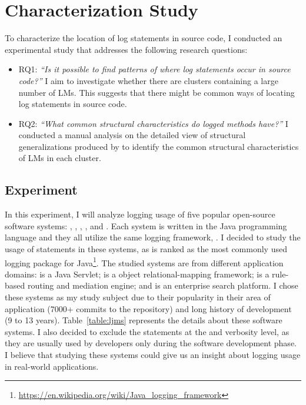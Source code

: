 \chapter{Characterization Study}\label{discover}\label{eval}

To characterize the location of log statements in source code, I conducted an experimental study that addresses the following research questions: 

\begin{itemize} [leftmargin=.5in]
\item \textsc{RQ1: }\emph{``Is it possible to find patterns of where log statements occur in source code?''} I aim to investigate whether there are clusters containing a large number of LMs. This suggests that there might be common ways of locating log statements in source code.

\item \textsc{RQ2: }\emph{``What common structural characteristics do logged methods have?''} I conducted a manual analysis on the detailed view of structural generalizations produced by  to identify the common structural characteristics of LMs in each cluster.
\end{itemize}


\section{Experiment}  \label{setup-characterization}
In this experiment, I will analyze logging usage of five popular open-source software systems: , , , , and . Each system is written in the Java programming language and they all utilize the same logging framework, . I decided to study the usage of  statements in these systems, as  is ranked as the most commonly used logging package for Java\footnote{\url{https://en.wikipedia.org/wiki/Java_logging_framework}}. The studied systems are from different application domains:  is a Java Servlet;  is a object relational-mapping framework;  is a rule-based routing and mediation engine; and  is an enterprise search platform. I chose these systems as my study subject due to their popularity in their area of application (7000+ commits to the  repository) and long history of development (9 to 13 years). Table~\ref{table:ljms} represents the details about these software systems. I also decided to exclude the  statements at the  and  verbosity level, as they are usually used by developers only during the software development phase. I believe that studying these systems could give us an insight about logging usage in real-world applications.


